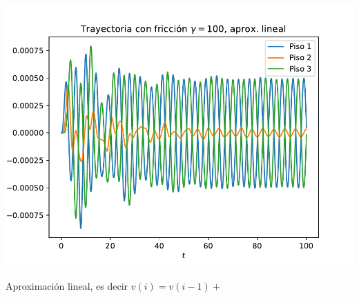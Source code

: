 \documentclass[11pt,letterpaper]{exam}
\begin{document}
\begin{center}
\includegraphics[width=14cm]{3_Edificio_bono2.pdf}
\end{center}
Aproximación lineal, es decir $v(i)=v(i-1)+$
\end{document}
